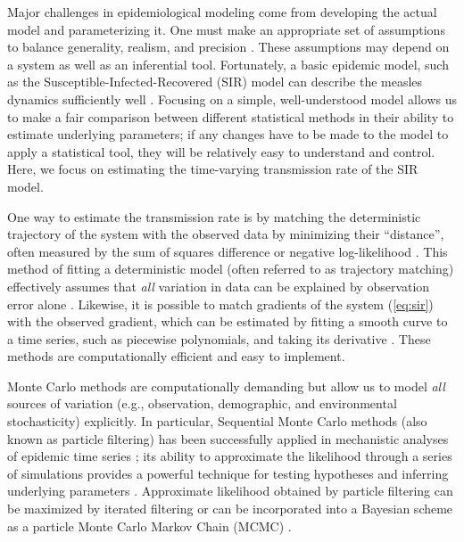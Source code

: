 \documentclass{article}
\newcommand{\eref}[1]{(\ref{eq:#1})}
\begin{document}
Major challenges in epidemiological modeling come from developing the actual model and parameterizing it.
One must make an appropriate set of assumptions to balance generality, realism, and precision \citep{levins1966strategy}.
These assumptions may depend on a system as well as an inferential tool.
Fortunately, a basic epidemic model, such as the Susceptible-Infected-Recovered (SIR) model can describe the measles dynamics sufficiently well \citep{earn2000simple, krylova2013effects, hempel2015century, dalziel2016persistent}.
Focusing on a simple, well-understood model allows us to make a fair comparison between different statistical methods in their ability to estimate underlying parameters;
if any changes have to be made to the model to apply a statistical tool, they will be relatively easy to understand and control.
Here, we focus on estimating the time-varying transmission rate of the SIR model.

One way to estimate the transmission rate is by matching the deterministic trajectory of the system with the observed data by minimizing their ``distance'', often measured by the sum of squares difference or negative log-likelihood \citep{riley2003transmission, chowell2004basic}.
This method of fitting a deterministic model (often referred to as trajectory matching) effectively assumes that \emph{all} variation in data can be explained by observation error alone \citep{bolker2008ecological}.
Likewise, it is possible to match gradients of the system \eref{sir} with the observed gradient, which can be estimated by fitting a smooth curve to a time series, such as piecewise polynomials, and taking its derivative \citep{ellner2002fitting}.
These methods are computationally efficient and easy to implement.

Monte Carlo methods are computationally demanding but allow us to model \emph{all} sources of variation (e.g., observation, demographic, and environmental stochasticity) explicitly.
In particular, Sequential Monte Carlo methods (also known as particle filtering) has been successfully applied in mechanistic analyses of epidemic time series \citep{he2009plug, he2011mechanistic, didelot2017model}; its ability to approximate the likelihood through a series of simulations provides a powerful technique for testing hypotheses and inferring underlying parameters \citep{ionides2006inference, breto2009time, king2015statistical}.
Approximate likelihood obtained by particle filtering can be maximized by iterated filtering \citep{ionides2011iterated, ionides2015inference} or can be incorporated into a Bayesian scheme as a particle Monte Carlo Markov Chain (MCMC) \citep{andrieu2010particle}.
\end{document}

